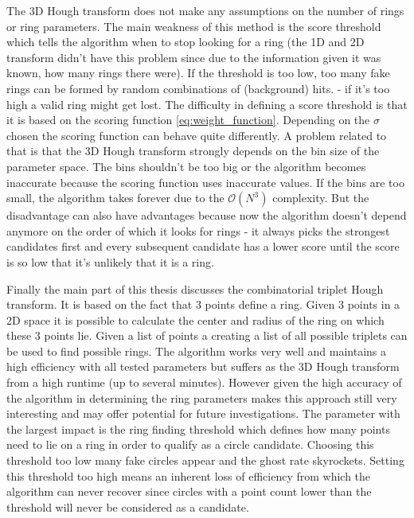 \documentclass[11pt]{scrreprt}
\begin{document}
The 3D Hough transform does not make any assumptions on the number of rings or ring parameters. The main weakness
of this method is the score threshold which tells the algorithm when to stop looking for a ring (the 1D and 2D transform didn't
have this problem since due to the information given it was known, how many rings there were). If the threshold is too low, too many 
fake rings can be formed by random combinations of (background) hits. - if it's too high a valid ring might get lost. The difficulty in defining a score threshold is 
that it is based on the scoring function \ref{eq:weight_function}. Depending on the $\sigma$ chosen the scoring function can behave
quite differently. A problem related to that is that the 3D Hough transform strongly depends on the bin size of the parameter space.
The bins shouldn't be too big or the algorithm becomes inaccurate because the scoring function uses inaccurate values. If the bins are too
small, the algorithm takes forever due to the $\mathcal{O}(N^3)$ complexity. But the disadvantage can also have advantages because
now the algorithm doesn't depend anymore on the order of which it looks for rings - it always picks the strongest candidates first
and every subsequent candidate has a lower score until the score is so low that it's unlikely that it is a ring.

Finally the main part of this thesis discusses the combinatorial triplet Hough transform. It is based on the fact that 3 points define a ring.
Given 3 points in a 2D space it is possible to calculate the center and radius of the ring on which these 3 points lie. Given a list
of points a creating a list of all possible triplets can be used to find possible rings. The algorithm works very well and maintains a high efficiency
with all tested parameters but suffers as the 3D Hough transform from a high runtime (up to several minutes). However given the high accuracy
of the algorithm in determining the ring parameters makes this approach still very interesting and may offer potential for future investigations.
The parameter with the largest impact is the ring finding threshold which defines how many points need to lie on a ring in order to qualify as a 
circle candidate. Choosing this threshold too low many fake circles appear and the ghost rate skyrockets. Setting this threshold too high
means an inherent loss of efficiency from which the algorithm can never recover since circles with a point count lower than the threshold
will never be considered as a candidate.
\end{document}
